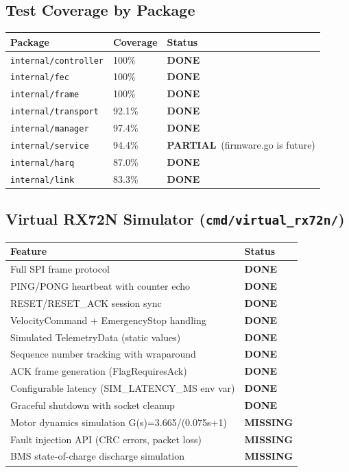 \documentclass[12pt,a4paper]{article}
\newcommand{\done}{\textcolor{okgreen}{\textbf{DONE}}}
\newcommand{\partialstatus}{\textcolor{warnorange}{\textbf{PARTIAL}}}
\newcommand{\missing}{\textcolor{criticalred}{\textbf{MISSING}}}
\begin{document}
\subsection{Test Coverage by Package}

\begin{center}
\small
\begin{tabular}{L{5cm}L{2.5cm}L{6cm}}
  \toprule
  \textbf{Package} & \textbf{Coverage} & \textbf{Status} \\
  \midrule
  \texttt{internal/controller} & 100\% & \done \\
  \texttt{internal/fec} & 100\% & \done \\
  \texttt{internal/frame} & 100\% & \done \\
  \texttt{internal/transport} & 92.1\% & \done \\
  \texttt{internal/manager} & 97.4\% & \done \\
  \texttt{internal/service} & 94.4\% & \partialstatus\ (firmware.go is future) \\
  \texttt{internal/harq} & 87.0\% & \done \\
  \texttt{internal/link} & 83.3\% & \done \\
  \bottomrule
\end{tabular}
\end{center}

\subsection{Virtual RX72N Simulator (\texttt{cmd/virtual\_rx72n/})}

\begin{center}
\small
\begin{tabular}{L{9cm}L{5cm}}
  \toprule
  \textbf{Feature} & \textbf{Status} \\
  \midrule
  Full SPI frame protocol & \done \\
  PING/PONG heartbeat with counter echo & \done \\
  RESET/RESET\_ACK session sync & \done \\
  VelocityCommand + EmergencyStop handling & \done \\
  Simulated TelemetryData (static values) & \done \\
  Sequence number tracking with wraparound & \done \\
  ACK frame generation (FlagRequiresAck) & \done \\
  Configurable latency (SIM\_LATENCY\_MS env var) & \done \\
  Graceful shutdown with socket cleanup & \done \\
  Motor dynamics simulation G(s)=3.665/(0.075s+1) & \missing \\
  Fault injection API (CRC errors, packet loss) & \missing \\
  BMS state-of-charge discharge simulation & \missing \\
  \bottomrule
\end{tabular}
\end{center}
\end{document}
